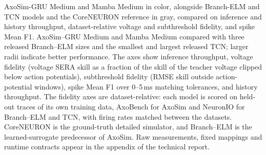 \documentclass[11pt]{article}
\begin{document}

\begin{publicationhead}
\makepublicationtitle
\end{publicationhead}

  {AxoSim-GRU Medium and Mamba Medium in color, alongside Branch-ELM and TCN models and the CoreNEURON reference in gray, compared on inference and history throughput, dataset-relative voltage and subthreshold fidelity, and spike Mean F1.}
  {AxoSim--GRU Medium and Mamba Medium compared with three released Branch--ELM sizes and the smallest and largest released TCN; larger radii indicate better performance. The axes show inference throughput, voltage fidelity (voltage SERA skill as a fraction of the skill of the teacher voltage clipped below action potentials), subthreshold fidelity (RMSE skill outside action-potential windows), spike Mean F1 over 0--5\,ms matching tolerances, and history throughput. The fidelity axes are dataset-relative: each model is scored on held-out traces of its own training data, AxoBench for AxoSim and NeuronIO for Branch--ELM and TCN, with firing rates matched between the datasets. CoreNEURON is the ground-truth detailed simulator, and Branch--ELM is the learned-surrogate predecessor of AxoSim. Raw measurements, fixed mappings and runtime contracts appear in the appendix of the technical report.}
\end{document}

